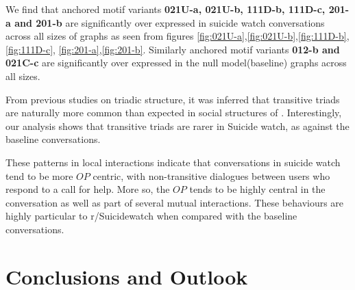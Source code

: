 We find that anchored motif variants \textbf{021U-a, 021U-b, 111D-b, 111D-c, 201-a and 201-b} are significantly over expressed in suicide watch conversations across all sizes of graphs as seen from figures \ref{fig:021U-a},\ref{fig:021U-b},\ref{fig:111D-b},\ref{fig:111D-c}, \ref{fig:201-a},\ref{fig:201-b}. Similarly anchored motif variants \textbf{012-b and 021C-c} are significantly over expressed in the null model(baseline) graphs across all sizes.

From previous studies on triadic structure, it was inferred that transitive triads are naturally more common than expected in social structures of . Interestingly, our analysis shows that transitive triads are rarer in Suicide watch, as against the baseline conversations. 

These patterns in local interactions indicate that conversations in suicide watch tend to be more $OP$ centric, with non-transitive dialogues between users who respond to a call for help. More so, the $OP$ tends to be highly central in the conversation as well as part of several mutual interactions. These behaviours are highly particular to r/Suicidewatch when compared with the baseline conversations.


\section{Conclusions and Outlook}

